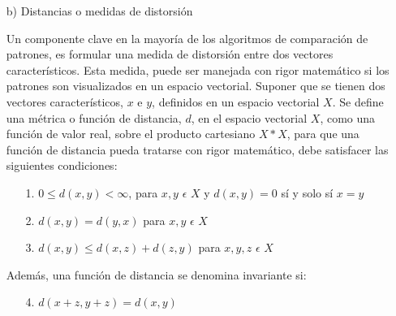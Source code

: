 \begin{enumerate}
\item[b)]Distancias o medidas de distorsión
\par
Un componente clave en la mayoría de los algoritmos de comparación de patrones, es formular una medida de distorsión entre dos vectores característicos. Esta medida, puede ser manejada con rigor matemático si los patrones son visualizados en un espacio vectorial.
\vskip 0.5cm
Suponer que se tienen dos vectores característicos, $x$ e $y$, definidos en un espacio vectorial $X$. Se define una métrica o función de distancia, $d$, en el espacio vectorial $X$, como una función de valor real, sobre el producto cartesiano $X*X$, para que una función de distancia pueda tratarse con rigor matemático, debe satisfacer las siguientes condiciones:
\begin{enumerate}
\item[1.]$0 \leq  d(x, y) < \infty$, para $x, y$ $\epsilon$ $X$ y $d(x,y) = 0$ sí y solo sí $x = y$
\item[2.]$d(x, y) = d(y, x)$ para $x, y$ $\epsilon$ $X$
\item[3.]$d(x, y) \leq  d(x, z) + d(z, y)$ para $x, y, z$ $\epsilon$ $X$
\end{enumerate}
Además, una función de distancia se denomina invariante si:
\begin{enumerate}
\item[4.]$d(x + z, y + z) = d(x,y)$
\end{enumerate}


\end{enumerate}
